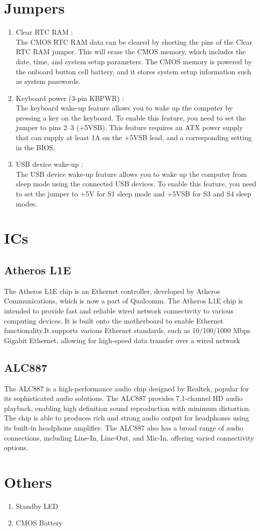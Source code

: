 \section{Jumpers}
\begin{enumerate}
    \item Clear RTC RAM : \\ 
        The CMOS RTC RAM data can be cleared by shorting the pins of the Clear RTC RAM jumper. This will erase the CMOS memory, which includes the date, time, and system setup parameters. The CMOS memory is powered by the onboard button cell battery, and it stores system setup information such as system passwords.
    \item Keyboard power (3-pin KBPWR) : \\
        The keyboard wake-up feature allows you to wake up the computer by pressing a key on the keyboard. To enable this feature, you need to set the jumper to pins 2–3 (+5VSB). This feature requires an ATX power supply that can supply at least 1A on the +5VSB lead, and a corresponding setting in the BIOS.
    \item USB device wake-up : \\
        The USB device wake-up feature allows you to wake up the computer from sleep mode using the connected USB devices. To enable this feature, you need to set the jumper to +5V for S1 sleep mode and +5VSB for S3 and S4 sleep modes.


\end{enumerate}
\section{ICs}
\subsection{Atheros L1E}

The Atheros L1E chip is an Ethernet controller, developed by Atheros Communications, which is now a part of Qualcomm. The Atheros L1E chip is intended to provide fast and reliable wired network connectivity to various computing devices. It is built onto the motherboard to enable Ethernet functionality.It supports various Ethernet standards, such as 10/100/1000 Mbps Gigabit Ethernet, allowing for high-speed data transfer over a wired network

\subsection{ALC887}
The ALC887 is a high-performance audio chip designed by Realtek, popular for its sophisticated audio solutions. The ALC887 provides 7.1-channel HD audio playback, enabling high definition sound reproduction with minimum distortion. The chip is able to produces rich and strong audio output for headphones using its built-in headphone amplifier. The ALC887 also has a broad range of audio connections, including Line-In, Line-Out, and Mic-In, offering varied connectivity options.

\section{Others}
\begin{enumerate}
  \item Standby LED
  \item CMOS Battery
\end{enumerate}



